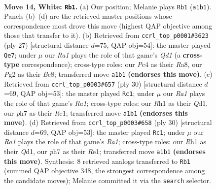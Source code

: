 \documentclass[11pt]{article}
\begin{document}
\clearpage

\begin{figure}[p]\centering
\begin{subfigure}{0.46\textwidth}\centering
\resizebox{\linewidth}{!}{%
\newchessgame
\chessboard[
  setfen={r3k2r/ppp2ppp/2bqp3/8/2PP4/5N2/PP2KPPP/R2Q3R w kq - 0 14},
  showmover=false,
  pgfstyle=straightmove, color=movearrow, markmove={a1-b1}
]}
\caption{}
\end{subfigure}\hfill
\begin{subfigure}{0.46\textwidth}\centering
\resizebox{\linewidth}{!}{%
\newchessgame
\chessboard[
  setfen={r1bq1rk1/1pp2ppp/p4n2/8/2B2P2/P1B1P3/1PQ3PP/R3K2R b KQ - 0 14},
  showmover=false,
  pgfstyle=straightmove, color=movearrow, markmove={d8-e7}
]}
\caption{}
\end{subfigure}
\\[4pt]
\begin{subfigure}{0.46\textwidth}\centering
\resizebox{\linewidth}{!}{%
\newchessgame
\chessboard[
  setfen={rn3r1k/pbp3pp/1p1q4/5p2/3P4/2N2PP1/PP4BP/R2QR1K1 w - - 1 16},
  showmover=false,
  pgfstyle=straightmove, color=movearrow, markmove={a1-c1}
]}
\caption{}
\end{subfigure}\hfill
\begin{subfigure}{0.46\textwidth}\centering
\resizebox{\linewidth}{!}{%
\newchessgame
\chessboard[
  setfen={rn3r1k/pbp3pp/1p1q4/5p2/3P4/2N2PP1/PP4BP/R2QR1K1 w - - 1 16},
  showmover=false,
  pgfstyle=straightmove, color=movearrow, markmove={a1-c1}
]}
\caption{}
\end{subfigure}
\caption{\textbf{Move 14, White: \texttt{Rb1}.} (a) Our position; Melanie plays \texttt{Rb1} (\texttt{a1b1}). Panels (b)--(d) are the retrieved master positions whose correspondence most drove this move (highest QAP objective among those that transfer to it). (b) Retrieved from \texttt{ccrl\_top\_p0001\#3623} (ply 27) [structural distance $d$=75, QAP obj=54]: the master played \texttt{Qe7}; under $\mu$ our \emph{Ra1} plays the role of that game's \emph{Qd1} (a \textbf{cross-type} correspondence); cross-type roles: our \emph{P}c4 as their \emph{R}a8, our \emph{P}g2 as their \emph{B}c8; transferred move \texttt{a1b1} \textbf{(endorses this move)}. (c) Retrieved from \texttt{ccrl\_top\_p0003\#657} (ply 30) [structural distance $d$=69, QAP obj=53]: the master played \texttt{Rc1}; under $\mu$ our \emph{Ra1} plays the role of that game's \emph{Ra1}; cross-type roles: our \emph{R}h1 as their \emph{Q}d1, our \emph{p}h7 as their \emph{R}e1; transferred move \texttt{a1b1} \textbf{(endorses this move)}. (d) Retrieved from \texttt{ccrl\_top\_p0003\#658} (ply 30) [structural distance $d$=69, QAP obj=53]: the master played \texttt{Rc1}; under $\mu$ our \emph{Ra1} plays the role of that game's \emph{Ra1}; cross-type roles: our \emph{R}h1 as their \emph{Q}d1, our \emph{p}h7 as their \emph{R}e1; transferred move \texttt{a1b1} \textbf{(endorses this move)}. Synthesis: 8 retrieved analogs transferred to \texttt{Rb1} (summed QAP objective 348, the strongest correspondence among the candidate moves); Melanie committed it via the \texttt{search} selector.}
\label{fig:thought-m26}
\end{figure}
\end{document}
